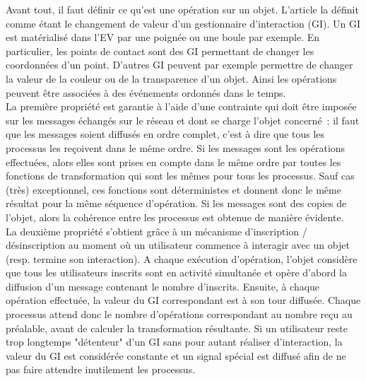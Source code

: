 \documentclass[11pt]{article}
\begin{document}
Avant tout, il faut définir ce qu'est une opération sur un objet. L'article \cite{margery} la définit comme étant le changement de valeur d'un gestionnaire d'interaction (GI). Un GI est matérialisé dans l'EV par une poignée ou une boule par exemple. En particulier, les points de contact sont des GI permettant de changer les coordonnées d'un point. D'autres GI peuvent par exemple permettre de changer la valeur de la couleur ou de la transparence d'un objet. Ainsi les opérations peuvent être associées à des événements ordonnés dans le temps.
\\

La première propriété est garantie à l'aide d'une contrainte qui doit être imposée sur les messages échangés sur le réseau et dont se charge l'objet concerné~: il faut que les messages soient diffusés en ordre complet, c'est à dire que tous les processus les reçoivent dans le même ordre. Si les messages sont les opérations effectuées, alors elles sont prises en compte dans le même ordre par toutes les fonctions de transformation qui sont les mêmes pour tous les processus. Sauf cas (très) exceptionnel, ces fonctions sont déterministes et donnent donc le même résultat pour la même séquence d'opération. Si les messages sont des copies de l'objet, alors la cohérence entre les processus est obtenue de manière évidente.
\\

La deuxième propriété s'obtient grâce à un mécanisme d'inscription / désinscription au moment où un utilisateur commence à interagir avec un objet (resp. termine son interaction). A chaque exécution d'opération, l'objet considère que tous les utilisateurs inscrits sont en activité simultanée et opère d'abord la diffusion d'un message contenant le nombre d'inscrits. Ensuite, à chaque opération effectuée, la valeur du GI correspondant est à son tour diffusée. Chaque processus attend donc le nombre d'opérations correspondant au nombre reçu au préalable, avant de calculer la transformation résultante. Si un utilisateur reste trop longtemps "détenteur" d'un GI sans pour autant réaliser d'interaction, la valeur du GI est considérée constante et un signal spécial est diffusé afin de ne pas faire attendre inutilement les processus.
\end{document}
